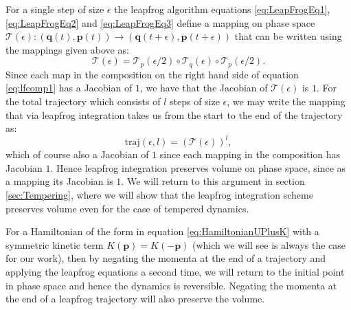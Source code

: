 \documentclass[12pt]{article}
\begin{document}
            For a single step of size $\epsilon$ the leapfrog algorithm equations \ref{eq:LeapFrogEq1}, \ref{eq:LeapFrogEq2} and \ref{eq:LeapFrogEq3} define a mapping on phase space $\mathcal{T}\left(\epsilon\right): \left(\bm{q}\left(t\right),\bm{p}\left(t\right)\right) \rightarrow \left(\bm{q}\left(t+\epsilon\right),\bm{p}\left(t+\epsilon\right)\right)$ that can be written using the mappings given above as:
            \begin{equation}
                \label{eq:lfcomp1}
                \mathcal{T}\left(\epsilon\right)=\mathcal{T}_p\left(\epsilon/2\right)\circ \mathcal{T}_q\left(\epsilon\right)\circ \mathcal{T}_p\left(\epsilon/2\right).
            \end{equation}
            Since each map in the composition on the right hand side of equation \ref{eq:lfcomp1} has a Jacobian of $1$, we have that the Jacobian of $\mathcal{T}\left(\epsilon\right)$ is $1$. For the total trajectory which consists of $l$ steps of size $\epsilon$, we may write the mapping that via leapfrog integration takes us from the start to the end of the trajectory as:
            \begin{equation}
                \text{traj}\left(\epsilon,l\right) = \left(\mathcal{T}\left(\epsilon\right)\right)^l,
            \end{equation}
            which of course also a Jacobian of $1$ since each mapping in the composition has Jacobian $1$. Hence leapfrog integration preserves volume on phase space, since as a mapping its Jacobian is $1$. We will return to this argument in section \ref{sec:Tempering}, where we will show that the leapfrog integration scheme preserves volume even for the case of tempered dynamics. 
            
            For a Hamiltonian of the form in equation \ref{eq:HamiltonianUPlusK} with a symmetric kinetic term $K\left(\bm{p}\right)=K\left(-\bm{p}\right)$ (which we will see is always the case for our work), then by negating the momenta at the end of a trajectory and applying the leapfrog equations a second time, we will return to the initial point in phase space and hence the dynamics is reversible. Negating the momenta at the end of a leapfrog trajectory will also preserve the volume.



        
\end{document}
